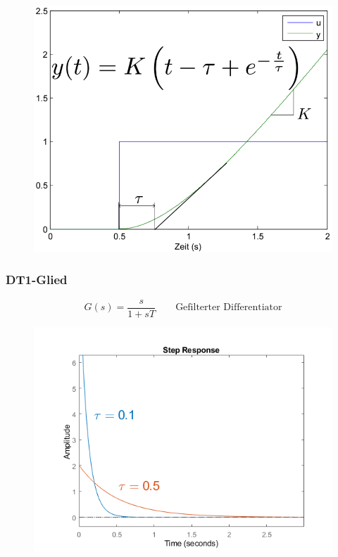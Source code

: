 \documentclass[
  10pt,
  a4paper,
]{article}
\numberwithin{equation}{section}
\begin{document}
\begin{multicols}{2}
\begin{figure}[H]
{\centering \includegraphics{images/paste-21.png}

}

\end{figure}

\hypertarget{dt1-glied}{%
\subsubsection{DT1-Glied}\label{dt1-glied}}

\[
G(s)=\frac{s}{1+sT} \qquad \text{Gefilterter Differentiator}
\]

\begin{figure}[H]

{\centering \includegraphics{images/paste-24.png}

}
\end{figure}
\end{multicols}
\end{document}
